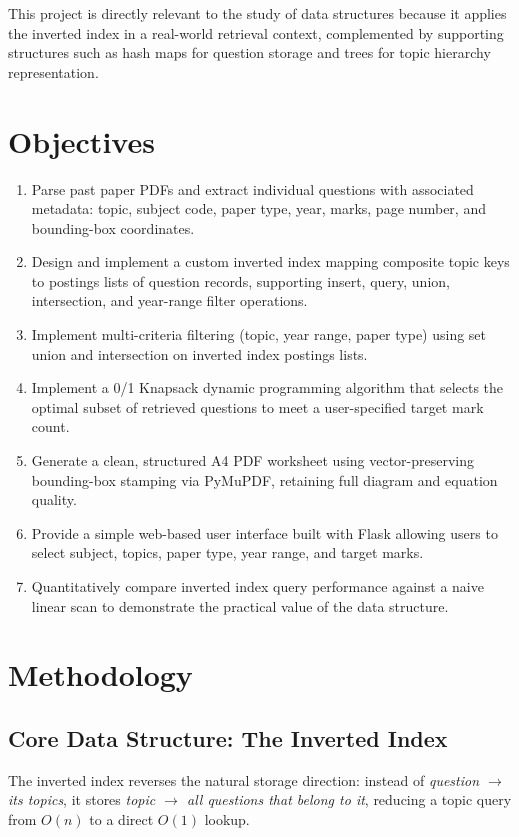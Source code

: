 \documentclass[10pt]{article}
\begin{document}
This project is directly relevant to the study of data structures because it applies the inverted index in a real-world retrieval context, complemented by supporting structures such as hash maps for question storage and trees for topic hierarchy representation.

\section{Objectives}
\begin{enumerate}
    \item Parse past paper PDFs and extract individual questions with associated metadata: topic, subject code, paper type, year, marks, page number, and bounding-box coordinates.
    \item Design and implement a custom inverted index mapping composite topic keys to postings lists of question records, supporting insert, query, union, intersection, and year-range filter operations.
    \item Implement multi-criteria filtering (topic, year range, paper type) using set union and intersection on inverted index postings lists.
    \item Implement a 0/1 Knapsack dynamic programming algorithm that selects the optimal subset of retrieved questions to meet a user-specified target mark count.
    \item Generate a clean, structured A4 PDF worksheet using vector-preserving bounding-box stamping via PyMuPDF, retaining full diagram and equation quality.
    \item Provide a simple web-based user interface built with Flask allowing users to select subject, topics, paper type, year range, and target marks.
    \item Quantitatively compare inverted index query performance against a naive linear scan to demonstrate the practical value of the data structure.
\end{enumerate}

\section{Methodology}

\subsection*{Core Data Structure: The Inverted Index}

The inverted index reverses the natural storage direction: instead of \textit{question $\to$ its topics}, it stores \textit{topic $\to$ all questions that belong to it}, reducing a topic query from $O(n)$ to a direct $O(1)$ lookup.
\end{document}
